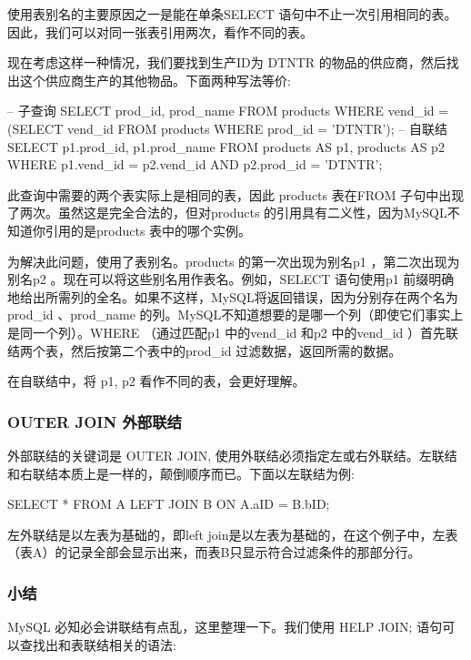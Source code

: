 使用表别名的主要原因之一是能在单条SELECT 语句中不止一次引用相同的表。因此，我们可以对同一张表引用两次，看作不同的表。

现在考虑这样一种情况，我们要找到生产ID为 DTNTR 的物品的供应商，然后找出这个供应商生产的其他物品。下面两种写法等价:

\begin{sql}
-- 子查询
SELECT prod_id, prod_name
FROM products
WHERE vend_id = (SELECT vend_id
                 FROM products
                 WHERE prod_id = 'DTNTR');
-- 自联结
SELECT p1.prod_id, p1.prod_name
FROM products AS p1, products AS p2
WHERE p1.vend_id = p2.vend_id
  AND p2.prod_id = 'DTNTR';
\end{sql}

此查询中需要的两个表实际上是相同的表，因此 products 表在FROM 子句中出现了两次。虽然这是完全合法的，但对products 的引用具有二义性，因为MySQL不知道你引用的是products 表中的哪个实例。

为解决此问题，使用了表别名。products 的第一次出现为别名p1 ，第二次出现为别名p2 。现在可以将这些别名用作表名。例如，SELECT 语句使用p1 前缀明确地给出所需列的全名。如果不这样，MySQL将返回错误，因为分别存在两个名为prod\_id 、prod\_name 的列。MySQL不知道想要的是哪一个列（即使它们事实上是同一个列）。WHERE （通过匹配p1 中的vend\_id 和p2 中的vend\_id ）首先联结两个表，然后按第二个表中的prod\_id 过滤数据，返回所需的数据。

在自联结中，将 p1, p2 看作不同的表，会更好理解。

\subsubsection{OUTER JOIN 外部联结}

外部联结的关键词是 OUTER JOIN, 使用外联结必须指定左或右外联结。左联结和右联结本质上是一样的，颠倒顺序而已。下面以左联结为例:

\begin{sql}
SELECT * FROM A LEFT JOIN B ON A.aID = B.bID;
\end{sql}

左外联结是以左表为基础的，即left join是以左表为基础的，在这个例子中，左表（表A）的记录全部会显示出来，而表B只显示符合过滤条件的那部分行。

\subsubsection{小结}

MySQL 必知必会讲联结有点乱，这里整理一下。我们使用 HELP JOIN; 语句可以查找出和表联结相关的语法:

